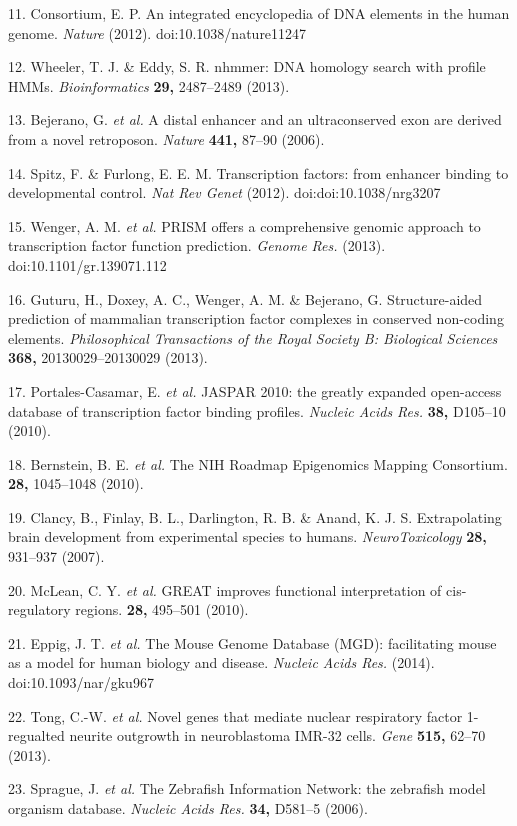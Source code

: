 \documentclass[]{article}
\begin{document}
11. Consortium, E. P. An integrated encyclopedia of DNA elements in the
human genome. \emph{Nature} (2012). doi:10.1038/nature11247

12. Wheeler, T. J. \& Eddy, S. R. nhmmer: DNA homology search with
profile HMMs. \emph{Bioinformatics} \textbf{29,} 2487--2489 (2013).

13. Bejerano, G. \emph{et al.} A distal enhancer and an ultraconserved
exon are derived from a novel retroposon. \emph{Nature} \textbf{441,}
87--90 (2006).

14. Spitz, F. \& Furlong, E. E. M. Transcription factors: from enhancer
binding to developmental control. \emph{Nat Rev Genet} (2012).
doi:doi:10.1038/nrg3207

15. Wenger, A. M. \emph{et al.} PRISM offers a comprehensive genomic
approach to transcription factor function prediction. \emph{Genome Res.}
(2013). doi:10.1101/gr.139071.112

16. Guturu, H., Doxey, A. C., Wenger, A. M. \& Bejerano, G.
Structure-aided prediction of mammalian transcription factor complexes
in conserved non-coding elements. \emph{Philosophical Transactions of
the Royal Society B: Biological Sciences} \textbf{368,}
20130029--20130029 (2013).

17. Portales-Casamar, E. \emph{et al.} JASPAR 2010: the greatly expanded
open-access database of transcription factor binding profiles.
\emph{Nucleic Acids Res.} \textbf{38,} D105--10 (2010).

18. Bernstein, B. E. \emph{et al.} The NIH Roadmap Epigenomics Mapping
Consortium. \textbf{28,} 1045--1048 (2010).

19. Clancy, B., Finlay, B. L., Darlington, R. B. \& Anand, K. J. S.
Extrapolating brain development from experimental species to humans.
\emph{NeuroToxicology} \textbf{28,} 931--937 (2007).

20. McLean, C. Y. \emph{et al.} GREAT improves functional interpretation
of cis-regulatory regions. \textbf{28,} 495--501 (2010).

21. Eppig, J. T. \emph{et al.} The Mouse Genome Database (MGD):
facilitating mouse as a model for human biology and disease.
\emph{Nucleic Acids Res.} (2014). doi:10.1093/nar/gku967

22. Tong, C.-W. \emph{et al.} Novel genes that mediate nuclear
respiratory factor 1-regualted neurite outgrowth in neuroblastoma IMR-32
cells. \emph{Gene} \textbf{515,} 62--70 (2013).

23. Sprague, J. \emph{et al.} The Zebrafish Information Network: the
zebrafish model organism database. \emph{Nucleic Acids Res.}
\textbf{34,} D581--5 (2006).
\end{document}
